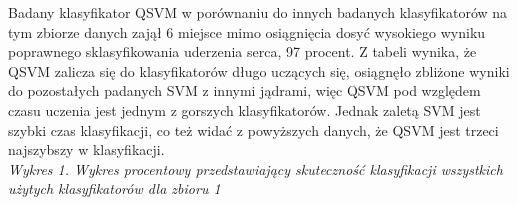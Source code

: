 \documentclass[11pt]{article}
\begin{document}
\begin{enumerate}
Badany klasyfikator QSVM w porównaniu do innych badanych klasyfikatorów na tym zbiorze danych zajął 6 miejsce mimo osiągnięcia dosyć wysokiego wyniku poprawnego sklasyfikowania uderzenia serca, 97 procent. Z tabeli wynika, że QSVM zalicza się do klasyfikatorów długo uczących się, osiągnęło zbliżone wyniki do pozostałych padanych  SVM z innymi jądrami, więc QSVM pod względem czasu uczenia jest jednym z gorszych klasyfikatorów. Jednak zaletą SVM jest szybki czas klasyfikacji, co też widać z powyższych danych, że QSVM jest trzeci najszybszy w klasyfikacji.  \\

 \newline
 \textit{Wykres 1. Wykres procentowy przedstawiający skuteczność klasyfikacji wszystkich użytych klasyfikatorów dla zbioru 1}
\newline


\end{enumerate}
\end{document}
